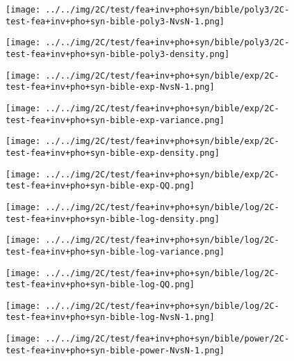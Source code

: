 \begin{figure}[H]
\centering	\texttt{[image: ../../img/2C/test/fea+inv+pho+syn/bible/poly3/2C-test-fea+inv+pho+syn-bible-poly3-NvsN-1.png]}
\end{figure}
\begin{figure}[H]
\centering	\texttt{[image: ../../img/2C/test/fea+inv+pho+syn/bible/poly3/2C-test-fea+inv+pho+syn-bible-poly3-density.png]}
\end{figure}
\begin{figure}[H]
\centering	\texttt{[image: ../../img/2C/test/fea+inv+pho+syn/bible/exp/2C-test-fea+inv+pho+syn-bible-exp-NvsN-1.png]}
\end{figure}
\begin{figure}[H]
\centering	\texttt{[image: ../../img/2C/test/fea+inv+pho+syn/bible/exp/2C-test-fea+inv+pho+syn-bible-exp-variance.png]}
\end{figure}
\begin{figure}[H]
\centering	\texttt{[image: ../../img/2C/test/fea+inv+pho+syn/bible/exp/2C-test-fea+inv+pho+syn-bible-exp-density.png]}
\end{figure}
\begin{figure}[H]
\centering	\texttt{[image: ../../img/2C/test/fea+inv+pho+syn/bible/exp/2C-test-fea+inv+pho+syn-bible-exp-QQ.png]}
\end{figure}
\begin{figure}[H]
\centering	\texttt{[image: ../../img/2C/test/fea+inv+pho+syn/bible/log/2C-test-fea+inv+pho+syn-bible-log-density.png]}
\end{figure}
\begin{figure}[H]
\centering	\texttt{[image: ../../img/2C/test/fea+inv+pho+syn/bible/log/2C-test-fea+inv+pho+syn-bible-log-variance.png]}
\end{figure}
\begin{figure}[H]
\centering	\texttt{[image: ../../img/2C/test/fea+inv+pho+syn/bible/log/2C-test-fea+inv+pho+syn-bible-log-QQ.png]}
\end{figure}
\begin{figure}[H]
\centering	\texttt{[image: ../../img/2C/test/fea+inv+pho+syn/bible/log/2C-test-fea+inv+pho+syn-bible-log-NvsN-1.png]}
\end{figure}
\begin{figure}[H]
\centering	\texttt{[image: ../../img/2C/test/fea+inv+pho+syn/bible/power/2C-test-fea+inv+pho+syn-bible-power-NvsN-1.png]}
\end{figure}
